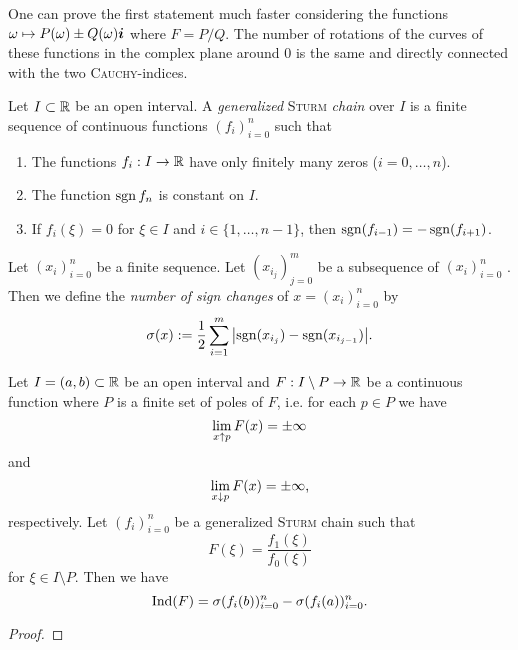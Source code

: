 \begin{remark}
One can prove the first statement much faster considering the functions $\omega\mapsto P(\omega)\pm Q(\omega)\boldsymbol{i}$ where $F=P/Q$. The number of rotations of the curves of these functions in the complex plane around 0 is the same and directly connected with the two \textsc{Cauchy}-indices.
\end{remark}

\begin{definition}
Let $I\subset\mathbb{R}$ be an open interval. A \emph{generalized} \textsc{Sturm} \emph{chain} over $I$ is a finite sequence of continuous functions $(f_i)_{i=0}^n$ such that
\begin{enumerate}
	\item The functions $f_i:I\rightarrow\mathbb{R}$ have only finitely many zeros ($i=0,\ldots,n$).
	\item The function $\operatorname{sgn}{f_n}$ is constant on $I$.
	\item If $f_i(\xi)=0$ for $\xi\in I$ and $i\in\{1,\ldots,n-1\}$, then $\operatorname{sgn}(f_{i-1})=-\operatorname{sgn}(f_{i+1})$.
\end{enumerate}
\end{definition}


\begin{definition}
Let $(x_i)_{i=0}^n$ be a finite sequence. Let $(x_{i_j})_{j=0}^m$ be a subsequence of $(x_i)_{i=0}^n$ %
. Then we define the \emph{number of sign changes} of $x=(x_i)_{i=0}^n$ by
\begin{equation}
\sigma(x):=\frac{1}{2}\sum_{i=1}^m{\left|\operatorname{sgn}(x_{i_j})-\operatorname{sgn}(x_{i_{j-1}})\right|}\text{.}
\end{equation}
\end{definition}


\begin{theorem}
Let $I=(a,b)\subset\mathbb{R}$ be an open interval and $F:I\setminus P\rightarrow \mathbb{R}$ be a continuous function where $P$ is a finite set of poles of $F$, i.e. for each $p\in P$ we have 
\begin{equation}
\lim_{x\uparrow p}{F(x)}=\pm\infty
\end{equation}
and 
\begin{equation}
\lim_{x\downarrow p}{F(x)}=\pm\infty\text{,}
\end{equation}
respectively. Let $(f_i)_{i=0}^n$ be a generalized \textsc{Sturm} chain such that 
\begin{equation}
F(\xi)=\frac{f_1(\xi)}{f_0(\xi)}
\end{equation}
for $\xi\in I\setminus P$. Then we have
\begin{equation}
\operatorname{Ind}(F)=\sigma(f_i(b))_{i=0}^n-\sigma(f_i(a))_{i=0}^n\text{.}
\end{equation}
\end{theorem}

\begin{proof}

\end{proof}
